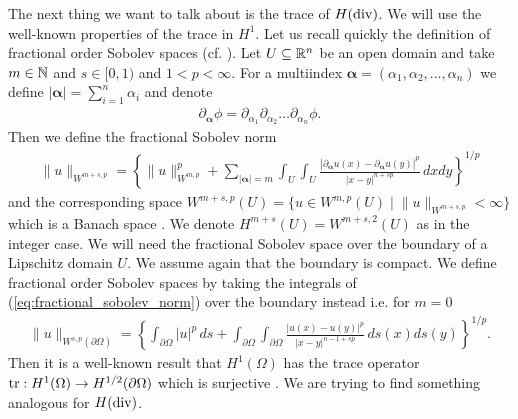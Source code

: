 \documentclass[../master_thesis.tex]{subfiles}
\begin{document}
The next thing we want to talk about is the trace of $H(\operatorname{div})$. 
We will use the well-known properties of the trace in $H^1$. 
Let us recall 
quickly the definition of fractional order Sobolev spaces (cf. \cite{}). Let 
$U \subseteq \mathbb{R}^n$ be an open domain and take $m \in \mathbb{N}$ and 
$s \in [0, 1)$ and $1 < p < \infty$. For a multiindex $\boldsymbol{\alpha} = 
(\alpha_1, \alpha_2, ..., \alpha_n)$ we define $|\boldsymbol{\alpha}| = \sum_{i=1}^n \alpha_i$ 
and denote 
\begin{align}
    \partial_{\bm{\alpha}} \phi = 
    \partial_{\alpha_1} \partial_{\alpha_2} \dots \partial_{\alpha_n} \phi.
\end{align}
Then we define the fractional Sobolev norm
\begin{align}
    \lVert u \rVert _ {W^{m+s, p}} = \left\{ \lVert u \rVert ^p_{W^{m, p}} + 
        \sum_{|\bm{\alpha}|=m} \int_U \int_U 
        \frac{|\partial_{\bm{\alpha}} u(x) - \partial_{\bm{\alpha}} u(y)|^p}
        {|x - y|^{n+sp}} \, dx dy\right\}^{1/p}\label{eq:fractional_sobolev_norm}
\end{align}
and the corresponding space $W^{m+s, p}(U) = \{ u \in W^{m,p}(U) \mid \lVert u \rVert _{W^{m+s, p}} < \infty \}$ 
which is a Banach space \cite[p.42]{monk}. We denote 
$H^{m+s}(U) = W^{m+s, 2}(U)$ as in the integer case. We will need the 
fractional Sobolev space over the boundary of a Lipschitz domain $U$. We assume 
again that the boundary is compact.
We define fractional order Sobolev spaces by taking the integrals of (\ref{eq:fractional_sobolev_norm}) 
over the boundary instead i.e. for $m = 0$
\begin{align*}
    \lVert u \rVert _{W^{s, p}(\partial \Omega)} = \left\{ \int_{\partial\Omega} |u|^p \, ds + 
        \int_{\partial\Omega} \int_{\partial\Omega}
        \frac{|u(x) - u(y)|^p}
        {|x - y|^{n-1+sp}} \, ds(x) ds(y)\right\}^{1/p}.
\end{align*}
Then it 
is a well-known result that $H^1(\Omega)$ has the trace operator 
$\operatorname{tr}: H^1(\Omega) \rightarrow H^{1/2}(\partial \Omega)$ which is surjective \cite[p.28]{arnold}.
We are trying to find something analogous for $H(\operatorname{div})$.
\end{document}
